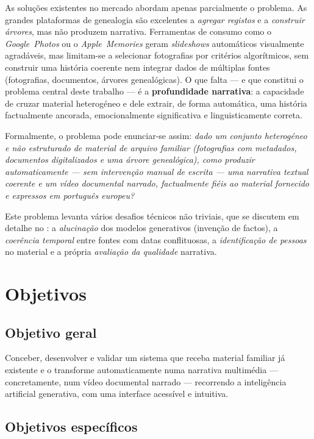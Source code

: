 As soluções existentes no mercado abordam apenas parcialmente o
problema. As grandes plataformas de genealogia são excelentes a
\emph{agregar registos} e a \emph{construir árvores}, mas não produzem
narrativa. Ferramentas de consumo como o \emph{Google~Photos} ou o
\emph{Apple~Memories} geram \emph{slideshows} automáticos visualmente
agradáveis, mas limitam-se a selecionar fotografias por critérios
algorítmicos, sem construir uma história coerente nem integrar dados de
múltiplas fontes (fotografias, documentos, árvores genealógicas). O que
falta — e que constitui o problema central deste trabalho — é a
\textbf{profundidade narrativa}: a capacidade de cruzar material
heterogéneo e dele extrair, de forma automática, uma história
factualmente ancorada, emocionalmente significativa e linguisticamente
correta.

Formalmente, o problema pode enunciar-se assim: \emph{dado um conjunto
heterogéneo e não estruturado de material de arquivo familiar
(fotografias com metadados, documentos digitalizados e uma árvore
genealógica), como produzir automaticamente — sem intervenção manual de
escrita — uma narrativa textual coerente e um vídeo documental narrado,
factualmente fiéis ao material fornecido e expressos em português
europeu?}

Este problema levanta vários desafios técnicos não triviais, que se
discutem em detalhe no : a \emph{alucinação} dos
modelos generativos (invenção de factos), a \emph{coerência temporal}
entre fontes com datas conflituosas, a \emph{identificação de pessoas} no
material e a própria \emph{avaliação da qualidade} narrativa.

\section{Objetivos}
\label{sec:objetivos}

\subsection{Objetivo geral}

Conceber, desenvolver e validar um sistema que receba material familiar
já existente e o transforme automaticamente numa narrativa multimédia —
concretamente, num vídeo documental narrado — recorrendo a inteligência
artificial generativa, com uma interface acessível e intuitiva.

\subsection{Objetivos específicos}

